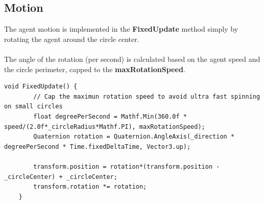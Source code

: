 \documentclass[12pt, a4paper]{article}
\begin{document}
\subsection{Motion}
The agent motion is implemented in the \textbf{FixedUpdate} method simply by rotating the agent around the circle center.\\\\
The angle of the rotation (per second) is calculated based on the agent speed and the circle perimeter, capped to the \textbf{maxRotationSpeed}.
\begin{lstlisting}[caption={FixedUpdate}]
   void FixedUpdate() {
        // Cap the maximun rotation speed to avoid ultra fast spinning on small circles
        float degreePerSecond = Mathf.Min(360.0f * speed/(2.0f*_circleRadius*Mathf.PI), maxRotationSpeed);
        Quaternion rotation = Quaternion.AngleAxis(_direction * degreePerSecond * Time.fixedDeltaTime, Vector3.up);

        transform.position = rotation*(transform.position - _circleCenter) + _circleCenter;
        transform.rotation *= rotation;
    }
\end{lstlisting}
\end{document}
